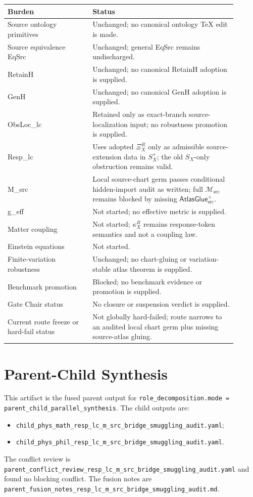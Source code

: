 \documentclass[11pt]{article}
\newcommand{\Msrc}{\mathcal{M}_{\mathrm{src}}}
\newcommand{\XiR}{\Xi_X^R}
\newcommand{\SX}{S_X}
\newcommand{\Splus}{S_X^+}
\newcommand{\AtlasGlue}{\mathsf{AtlasGlue}_{\mathrm{src}}^{+}}
\begin{document}
\begin{center}
\begin{tabular}{p{0.33\linewidth}p{0.57\linewidth}}
\hline
Burden & Status \\
\hline
Source ontology primitives & Unchanged; no canonical ontology TeX edit is made. \\
Source equivalence EqSrc & Unchanged; general EqSrc remains undischarged. \\
RetainH & Unchanged; no canonical RetainH adoption is supplied. \\
GenH & Unchanged; no canonical GenH adoption is supplied. \\
ObsLoc\_lc & Retained only as exact-branch source-localization input; no robustness promotion is supplied. \\
Resp\_lc & Uses adopted \(\XiR\) only as admissible source-extension data in \(\Splus\); the old \(\SX\)-only obstruction remains valid. \\
M\_src & Local source-chart germ passes conditional hidden-import audit as written; full \(\Msrc\) remains blocked by missing \(\AtlasGlue\). \\
g\_eff & Not started; no effective metric is supplied. \\
Matter coupling & Not started; \(\kappa_X^R\) remains response-token semantics and not a coupling law. \\
Einstein equations & Not started. \\
Finite-variation robustness & Unchanged; no chart-gluing or variation-stable atlas theorem is supplied. \\
Benchmark promotion & Blocked; no benchmark evidence or promotion is supplied. \\
Gate Chair status & No closure or suspension verdict is supplied. \\
Current route freeze or hard-fail status & Not globally hard-failed; route narrows to an audited local chart germ plus missing source-atlas gluing. \\
\hline
\end{tabular}
\end{center}

\section{Parent-Child Synthesis}

This artifact is the fused parent output for
\texttt{role\_decomposition.mode = parent\_child\_parallel\_synthesis}. The
child outputs are:
\begin{itemize}
  \item \texttt{child\_phys\_math\_resp\_lc\_m\_src\_bridge\_smuggling\_audit.yaml};
  \item \texttt{child\_phys\_phil\_resp\_lc\_m\_src\_bridge\_smuggling\_audit.yaml}.
\end{itemize}
The conflict review is
\texttt{parent\_conflict\_review\_resp\_lc\_m\_src\_bridge\_smuggling\_audit.yaml}
and found no blocking conflict. The fusion notes are
\texttt{parent\_fusion\_notes\_resp\_lc\_m\_src\_bridge\_smuggling\_audit.md}.
\end{document}
